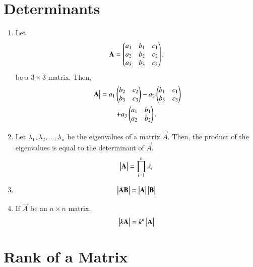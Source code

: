 \section{Determinants}
\begin{enumerate}[label=\thesection.\arabic*.,ref=\thesection.\theenumi]

\item Let 
\begin{align}
	\mathbf{A} = \begin{pmatrix}a_1 & b_1 & c_1  \\ a_2 & b_2 & c_2  \\ a_3 & b_3 & c_3\end{pmatrix}.
\end{align}
be a $3 \times 3$ matrix. 
Then, 
\begin{multline}
	\begin{vmatrix}\mathbf{A}\end{vmatrix} = a_1 \begin{pmatrix} b_2 & c_2 \\  b_3 & c_3\end{pmatrix} - a_2\begin{pmatrix} b_1 & c_1 \\  b_3 & c_3 \end{pmatrix}  \\ + a_3\begin{pmatrix}a_1 & b_1 \\ a_2 & b_2 \end{pmatrix}.
\end{multline}
\item Let $\lambda_1,\lambda_2, \dots, \lambda_n$ be the eigenvalues of a matrix $\vec{A}$.  Then,   the product of the eigenvalues is equal to the determinant of $\vec{A}$.
\begin{align}
	\begin{vmatrix}\mathbf{A}\end{vmatrix} = \prod_{i=1}^{n}\lambda_i
\end{align}
%
\item 
\begin{align}
	\begin{vmatrix}\mathbf{A}\mathbf{B}\end{vmatrix} = \begin{vmatrix}\mathbf{A}\end{vmatrix}\begin{vmatrix}\mathbf{B}\end{vmatrix}
\end{align}
\item If $\vec{A}$ be an $n \times n$ matrix, 
\begin{align}
	\label{eq:det_kord}
	\begin{vmatrix}k\mathbf{A}\end{vmatrix} = k^n\begin{vmatrix}\mathbf{A}\end{vmatrix}
\end{align}

\end{enumerate}
\section{Rank of a Matrix}
\begin{enumerate}[label=\thesection.\arabic*.,ref=\thesection.\theenumi]
\end{enumerate}
